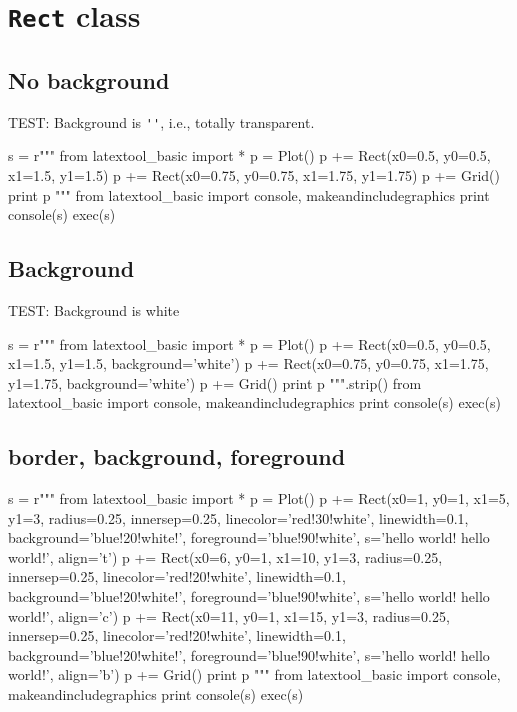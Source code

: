 \section{\texttt{Rect} class}


\subsection{No background}
TEST: Background is \verb!''!, i.e., totally transparent.
\begin{python}
s = r"""
from latextool_basic import *
p = Plot()
p += Rect(x0=0.5, y0=0.5, x1=1.5, y1=1.5)
p += Rect(x0=0.75, y0=0.75, x1=1.75, y1=1.75)
p += Grid()
print p
"""
from latextool_basic import console, makeandincludegraphics
print console(s)
exec(s)
\end{python}


\subsection{Background}

TEST: Background is white
\begin{python}
s = r"""
from latextool_basic import *
p = Plot()
p += Rect(x0=0.5, y0=0.5, x1=1.5, y1=1.5, background='white')
p += Rect(x0=0.75, y0=0.75, x1=1.75, y1=1.75, background='white')
p += Grid()
print p
""".strip()
from latextool_basic import console, makeandincludegraphics
print console(s)
exec(s)
\end{python}


\newpage
\subsection{border, background, foreground}
\begin{python}
s = r"""
from latextool_basic import *
p = Plot()
p += Rect(x0=1, y0=1, x1=5, y1=3,
          radius=0.25, innersep=0.25,
          linecolor='red!30!white', linewidth=0.1,
          background='blue!20!white!', foreground='blue!90!white', 
          s='hello world! hello world!', align='t')
p += Rect(x0=6, y0=1, x1=10, y1=3,
          radius=0.25, innersep=0.25,
          linecolor='red!20!white', linewidth=0.1,
          background='blue!20!white!', foreground='blue!90!white', 
          s='hello world! hello world!', align='c')
p += Rect(x0=11, y0=1, x1=15, y1=3,
          radius=0.25, innersep=0.25,
          linecolor='red!20!white', linewidth=0.1,
          background='blue!20!white!', foreground='blue!90!white', 
          s='hello world! hello world!', align='b')
p += Grid()
print p
"""
from latextool_basic import console, makeandincludegraphics
print console(s)
exec(s)
\end{python}


